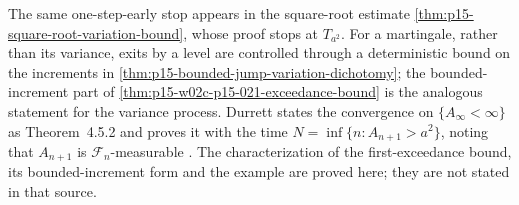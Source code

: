 The same one-step-early stop appears in the square-root estimate
\cref{thm:p15-square-root-variation-bound}, whose proof stops at
\(T_{a^2}\). For a martingale, rather than its variance, exits by a
level are controlled through a deterministic bound on the increments in
\cref{thm:p15-bounded-jump-variation-dichotomy}; the bounded-increment
part of \cref{thm:p15-w02c-p15-021-exceedance-bound} is the analogous
statement for the variance process. Durrett states the convergence on
\(\{A_\infty<\infty\}\) as Theorem~4.5.2 and proves it with the time
\(N=\inf\{n:A_{n+1}>a^2\}\), noting that \(A_{n+1}\) is
\(\mathcal F_n\)-measurable \cite[thm.~4.5.2, p.~240]{DurrettPTEAuthor2019}.
The characterization of the first-exceedance bound, its bounded-increment
form and the example are proved here; they are not stated in that source.
